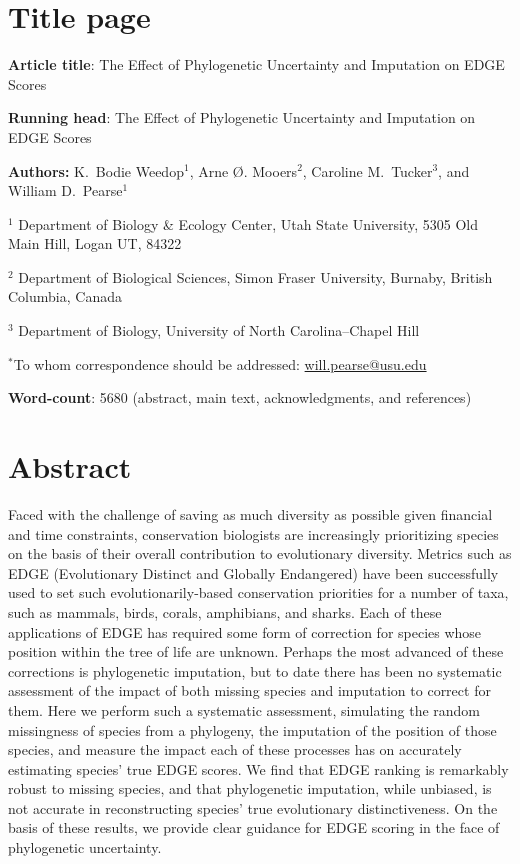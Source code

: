 \documentclass[12pt,english]{article}
\begin{document}
\setlength{\parindent}{0pt}
\section*{Title page}

\textbf{Article title}: The Effect of Phylogenetic Uncertainty and Imputation on EDGE Scores

\textbf{Running head}: The Effect of Phylogenetic Uncertainty and Imputation on EDGE Scores

\textbf{Authors:} K.\ Bodie Weedop$^{1}$, Arne \O. Mooers$^2$, Caroline M.\ Tucker$^3$, and William D.\ Pearse$^{1}$\

$^1$ Department of Biology \& Ecology Center, Utah State University,
5305 Old Main Hill, Logan UT, 84322

$^2$ Department of Biological Sciences, Simon Fraser University, Burnaby,
British Columbia, Canada

$^3$ Department of Biology, University of North Carolina–Chapel Hill

$^*$To whom correspondence should be addressed:
\url{will.pearse@usu.edu}

\textbf{Word-count}: 5680 (abstract, main text, acknowledgments, and
  references)

\clearpage
\section*{Abstract}

Faced with the challenge of saving as much diversity as possible given financial
and time constraints, conservation biologists are increasingly prioritizing
species on the basis of their overall contribution to evolutionary diversity.
Metrics such as EDGE (Evolutionary Distinct and Globally Endangered) have been
successfully used to set such evolutionarily-based conservation priorities for a
number of taxa, such as mammals, birds, corals, amphibians, and sharks. Each of
these applications of EDGE has required some form of correction for species
whose position within the tree of life are unknown. Perhaps the most advanced of
these corrections is phylogenetic imputation, but to date there has been no
systematic assessment of the impact of both missing species and imputation to
correct for them. Here we perform such a systematic assessment, simulating the
random missingness of species from a phylogeny, the imputation of the position
of those species, and measure the impact each of these processes has on
accurately estimating species' true EDGE scores. We find that EDGE ranking is
remarkably robust to missing species, and that phylogenetic imputation, while
unbiased, is not accurate in reconstructing species' true evolutionary
distinctiveness. On the basis of these results, we provide clear guidance for
EDGE scoring in the face of phylogenetic uncertainty.
\end{document}
